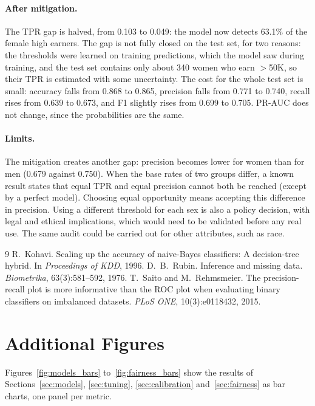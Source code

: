 \documentclass[10pt,a4paper]{article}
\newcommand{\high}{$>$50K}
\begin{document}
\paragraph{After mitigation.}
The TPR gap is halved, from 0.103 to 0.049: the model now detects 63.1\% of the female
high earners. The gap is not fully closed on the test set, for two reasons: the
thresholds were learned on training predictions, which the model saw during training,
and the test set contains only about 340 women who earn \high{}, so their TPR is
estimated with some uncertainty. The cost for the whole test set is small: accuracy falls from 0.868 to 0.865, precision
falls from 0.771 to 0.740, recall rises from 0.639 to 0.673, and F1 slightly rises from
0.699 to 0.705. PR-AUC does not change, since the probabilities are the same.

\paragraph{Limits.}
The mitigation creates another gap: precision becomes lower for women than for men
(0.679 against 0.750). When the base rates of two groups
differ, a known result states that equal TPR and equal precision cannot both be reached
(except by a perfect model). Choosing equal opportunity means accepting this
difference in precision. Using a different threshold for each sex is also a policy
decision, with legal and ethical implications, which would need to be validated before
any real use. The same audit could be carried out for other attributes, such as race.

\begin{thebibliography}{9}
 R.~Kohavi. Scaling up the accuracy of naive-Bayes classifiers: A decision-tree hybrid. In \emph{Proceedings of KDD}, 1996.
 D.~B.~Rubin. Inference and missing data. \emph{Biometrika}, 63(3):581--592, 1976.
 T.~Saito and M.~Rehmsmeier. The precision-recall plot is more informative than the ROC plot when evaluating binary classifiers on imbalanced datasets. \emph{PLoS ONE}, 10(3):e0118432, 2015.
\end{thebibliography}

\appendix
\section{Additional Figures}
\label{app:figures}

Figures~\ref{fig:models_bars} to~\ref{fig:fairness_bars} show the results of
Sections~\ref{sec:models}, \ref{sec:tuning}, \ref{sec:calibration} and~\ref{sec:fairness}
as bar charts, one panel per metric.
\end{document}
